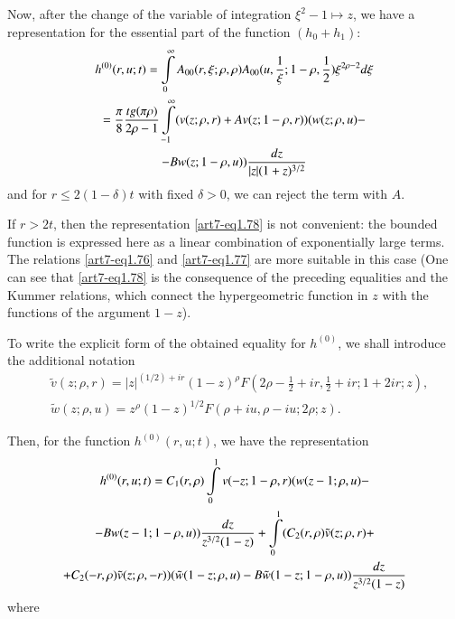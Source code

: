Now, after the change of the variable of integration $\xi^2 -1 \mapsto z$, we have a representation for the essential part of the function $(h_0 + h_1)$:
\begin{gather}
h^{(0)} (r, u; t) = \int\limits^\infty_0 A_{00} (r, \xi; \rho, \rho) A_{00} (u, \frac{1}{\xi}; 1 - \rho, \frac{1}{2}) \xi^{2 \rho -2} d \xi  \label{art7-eq7.7}\\
= \frac{\pi}{8} \frac{tg (\pi \rho)}{2 \rho-1} \int\limits^\infty_{-1} (v (z; \rho, r) + Av (z ; 1 - \rho, r)) (w (z; \rho, u)-\notag\\
- B w (z; 1 - \rho, u)) \frac{dz}{|z| (1+z)^{3/2}} \notag
\end{gather}
and for $r \leqslant 2 (1-\delta)t$  with fixed $\delta>0$, we can reject the term with $A$. 

If $r > 2 t$, then the representation \eqref{art7-eq1.78} is not convenient: the bounded function is expressed here as a linear combination of exponentially large terms. The relations \eqref{art7-eq1.76} and \eqref{art7-eq1.77} are more suitable in this case (One can see that \eqref{art7-eq1.78} is the consequence of the preceding equalities and the Kummer relations, which connect the hypergeometric function in $z$ with the functions of the argument $1-z$).  

To write the explicit form of the obtained equality for $h^{(0)}$, we shall introduce the additional notation
\begin{align}
& \tilde{v} (z; \rho, r) = |z|^{(1/2)+ir} (1-z)^{\rho} F (2 \rho -\frac{1}{2} + ir, \frac{1}{2} + ir; 1 + 2 ir; z), 
\label{art7-eq7.8}\\
&  \tilde{w} (z; \rho, u) = z^{\rho} (1-z)^{1/2} F(\rho + iu, \rho- iu; 2 \rho; z).\label{art-eq7.9}
\end{align}

Then, for the function $h^{(0)}(r, u;t)$, we have the representation 
\begin{gather}
h^{(0)} (r, u; t) = C_1 (r, \rho) \int\limits^1_0 v (-z ; 1 -\rho,r) (w (z-1; \rho, u)- \label{art7-eq7.10}\\
- B w (z-1; 1-\rho, u)) \frac{dz}{z^{3/2} (1-z)} + \int\limits^1_0 (C_2 (r,\rho) \tilde{v} (z; \rho, r)+\notag\\
+ C_2 (-r, \rho) \tilde{v} (z; \rho, -r)) (\tilde{w}(1-z; \rho, u) - B \tilde{w} (1-z; 1-\rho, u)) \frac{dz}{z^{3/2} (1-z)} \notag
\end{gather}
where 

